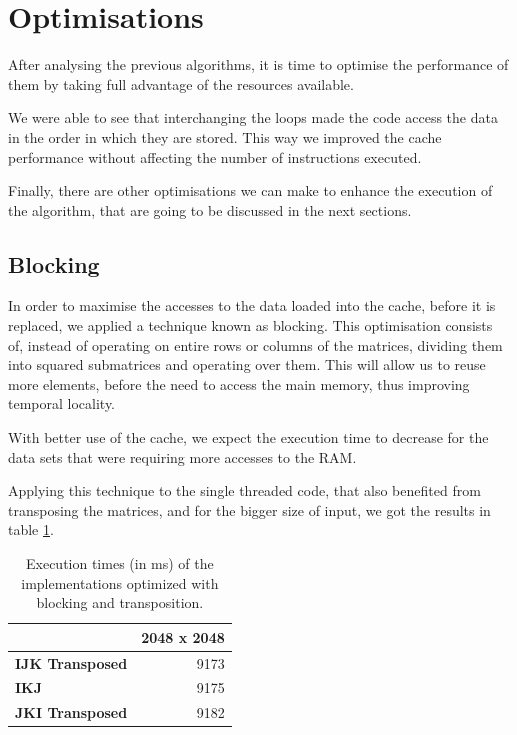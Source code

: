 \documentclass[twoside,twocolumn]{article}
\begin{document}
\section{Optimisations}

After analysing the previous algorithms, it is time to optimise the performance of them by taking full advantage of the resources available.

We were able to see that interchanging the loops made the code access the data in the order in which they are stored. This way we improved the cache performance without affecting the number of instructions executed.

Finally, there are other optimisations we can make to enhance the execution of the algorithm, that are going to be discussed in the next sections.

\subsection{Blocking}

In order to maximise the accesses to the data loaded into the cache, before it is replaced, we applied a technique known as blocking. This optimisation consists of, instead of operating on entire rows or columns of the matrices, dividing them into squared submatrices and operating over them. This will allow us to reuse more elements, before the need to access the main memory, thus improving temporal locality.

With better use of the cache, we expect the execution time to decrease for the data sets that were requiring more accesses to the RAM.

Applying this technique to the single threaded code, that also benefited from transposing the matrices, and for the bigger size of input, we got the results in table \ref{tab:blocking}.

\begin{table}[h]
\centering
\begin{tabular}{|l|r|}
\hline
                        & \multicolumn{1}{c|}{\textbf{2048 x 2048}} \\ \hline
\textbf{IJK Transposed} & 9173                                      \\ \hline
\textbf{IKJ}            & 9175                                      \\ \hline
\textbf{JKI Transposed} & 9182                                      \\ \hline
\end{tabular}%
\caption{Execution times (in ms) of the implementations optimized with blocking and transposition.}
\label{tab:blocking}
\end{table}
\end{document}
